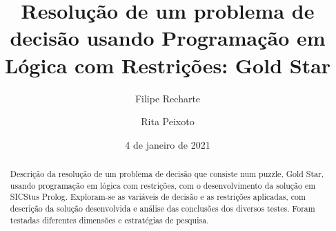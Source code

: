 \documentclass[runningheads]{llncs}
\begin{document}
%
\title{Resolução de um problema de decisão usando Programação em Lógica com Restrições: Gold Star}
%
%
\author{Filipe Recharte}
\author{Rita Peixoto}

\date{4 de janeiro de 2021} 


%
\maketitle              %
%
\begin{abstract}
Descrição da resolução de um problema de decisão que consiste num puzzle, Gold Star, usando programação em lógica com restrições, com o desenvolvimento da solução em SICStus Prolog. Exploram-se as variáveis de decisão e as restrições aplicadas, com descrição da solução desenvolvida e análise das conclusões dos diversos testes. Foram testadas diferentes dimensões e estratégias de pesquisa.

\end{abstract}
















\end{document}

